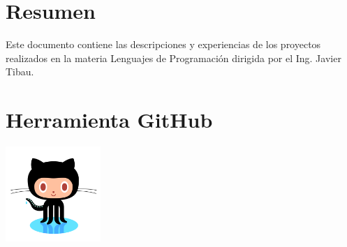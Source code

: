 \documentclass[12pt]{report}
\begin{document}
\chapter*{Resumen} 

Este documento contiene las descripciones y experiencias de los proyectos realizados en la materia Lenguajes de Programación dirigida por el Ing. Javier Tibau.

\tableofcontents


\chapter{Herramienta GitHub\label{capitulouno}}

	\begin{center}
		\begingroup
			\includegraphics[width=0.27\textwidth]{imagenes_usuario/git.png}
		\endgroup
	\end{center}
\end{document}
